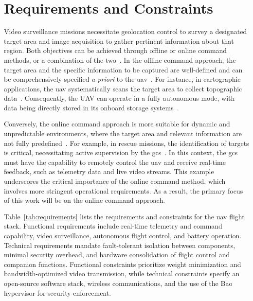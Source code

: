 
\section{Requirements and Constraints}
\label{sec:req-sec}
Video surveillance missions necessitate geolocation control to survey a
designated target area and image acquisition to gather pertinent information
about that region. Both objectives can be achieved through offline or online
command methods, or a combination of the two~\cite{gugan2023path}.
%
In the offline command approach, the target area and the specific information to
be captured are well-defined and can be comprehensively specified \emph{a
priori} to the \gls{uav}~\cite{gugan2023path}. For instance, in cartographic
applications, the \gls{uav} systematically scans the target area to collect
topographic data~\cite{caroti_uav-borne_2017}. Consequently,
the UAV can operate in a fully autonomous mode, with data being directly stored
in its onboard storage systems~\cite{qgc-survey}.

Conversely, the online command approach is more suitable for dynamic and
unpredictable environments, where the target area and relevant information are
not fully predefined~\cite{gugan2023path}. For example, in rescue missions, the identification of
targets is critical, necessitating active supervision by the \gls{gcs}~\cite{mohsan2022towards}. In this
context, the \gls{gcs} must have the capability to remotely control the
\gls{uav} and receive real-time feedback, such as telemetry data and live video
streams.
%
This example underscores the critical importance of the online command method,
which involves more stringent operational requirements. As a result, the primary
focus of this work will be on the online command approach.

Table~\ref{tab:requirements} lists the requirements and constraints for the
\gls{uav} flight stack. Functional requirements include real-time telemetry and
command capability, video surveillance, autonomous flight control, and battery
operation. Technical requirements mandate fault-tolerant isolation between
components, minimal security overhead, and hardware consolidation of flight
control and companion functions. Functional constraints prioritize weight
minimization and bandwidth-optimized video transmission, while technical
constraints specify an open-source software stack, wireless communications,
and the use of the Bao hypervisor for security enforcement.

